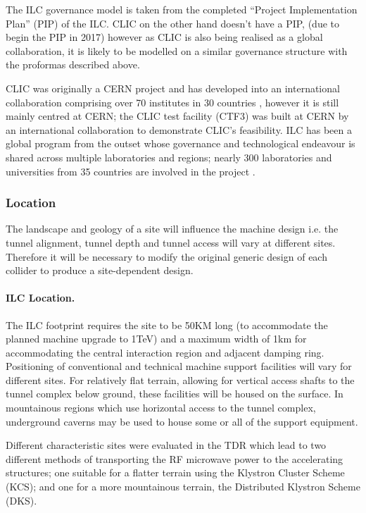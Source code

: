 The ILC governance model is taken from the completed ``Project Implementation Plan'' (PIP) of the ILC. CLIC on the other hand doesn’t have a PIP, (due to begin the PIP in 2017) however as CLIC is also being realised as a global collaboration, it is likely to be modelled on a similar governance structure with the proformas described above.

CLIC was originally a CERN project and has developed into an international collaboration comprising over 70 institutes in 30 countries \cite{CLIC:Organisation}, however it is still mainly centred at CERN; the CLIC test facility (CTF3) was built at CERN by an international collaboration to demonstrate CLIC’s feasibility. ILC has been a global program from the outset whose governance and technological endeavour is shared across multiple laboratories and regions; nearly 300 laboratories and universities from 35 countries are involved in the project \cite{ILC:Collab}.

\subsubsection{Location}

The landscape and geology of a site will influence the machine design i.e. the tunnel alignment, tunnel depth and tunnel access will vary at different sites. Therefore it will be necessary to modify the original generic design of each collider to produce a site-dependent design.

\paragraph{ILC Location.}

The ILC footprint requires the site to be 50KM long (to accommodate the planned machine upgrade to 1TeV) and a maximum width of 1km for accommodating the central interaction region and adjacent damping ring. Positioning of conventional and technical machine support facilities will vary for different sites. For relatively flat terrain, allowing for vertical access shafts to the tunnel complex below ground, these facilities will be housed on the surface. In mountainous regions which use horizontal access to the tunnel complex, underground caverns may be used to house some or all of the support equipment. \cite{ILC:PIPReport}

Different characteristic sites were evaluated in the TDR which lead to two different methods of transporting the RF microwave power to the accelerating structures; one suitable for a flatter terrain using the Klystron Cluster Scheme (KCS); and one for a more mountainous terrain,  the Distributed Klystron Scheme (DKS). \cite{ILC:TechnicalDesignReport}

